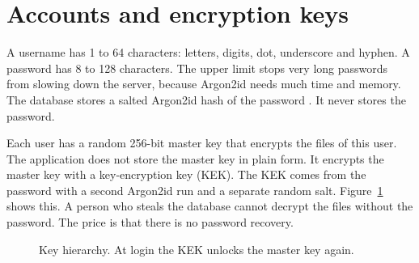 \section{Accounts and encryption keys}

A username has 1 to 64 characters: letters, digits, dot, underscore and hyphen. A password has 8 to 128 characters. The upper limit stops very long passwords from slowing down the server, because Argon2id needs much time and memory. The database stores a salted Argon2id hash of the password \cite{rfc9106, owaspPasswords}. It never stores the password.

Each user has a random 256-bit master key that encrypts the files of this user. The application does not store the master key in plain form. It encrypts the master key with a key-encryption key (KEK). The KEK comes from the password with a second Argon2id run and a separate random salt. Figure~\ref{fig:keys} shows this. A person who steals the database cannot decrypt the files without the password. The price is that there is no password recovery.

\begin{figure}[htb]
    \centering
    \caption{Key hierarchy. At login the KEK unlocks the master key again.}
    \label{fig:keys}
\end{figure}


